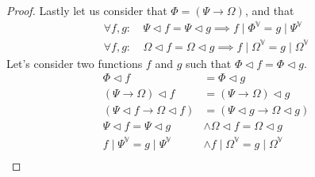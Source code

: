 \documentclass{article}
\begin{document}
\begin{proof}
Lastly let us consider that $\Phi = (\Psi\rightarrow\Omega)$, and that
\begin{align*}
\forall f,g: & \: \Psi   \lhd f = \Psi   \lhd g \implies f\mid\Phi^\mathbb{V}  =g\mid\Psi^\mathbb{V}   \\
\forall f,g: & \: \Omega \lhd f = \Omega \lhd g \implies f\mid\Omega^\mathbb{V}=g\mid\Omega^\mathbb{V}
\end{align*}
Let's consider two functions $f$ and $g$ such that $\Phi\lhd f=\Phi\lhd g$.
\begin{align*}
\Phi\lhd f                          &= \Phi\lhd g                              \\
(\Psi\rightarrow\Omega)\lhd f       &= (\Psi\rightarrow\Omega)\lhd g           \\
(\Psi\lhd f\rightarrow\Omega\lhd f) &= (\Psi\lhd g\rightarrow\Omega\lhd g)     \\
\Psi\lhd f = \Psi\lhd g             &\land \Omega\lhd f = \Omega\lhd g         \\
f\mid\Psi^\mathbb{V} = g\mid\Psi^\mathbb{V}     &\land f\mid\Omega^\mathbb{V} = g\mid\Omega^\mathbb{V} \\
\end{align*}

\end{proof}
\end{document}
